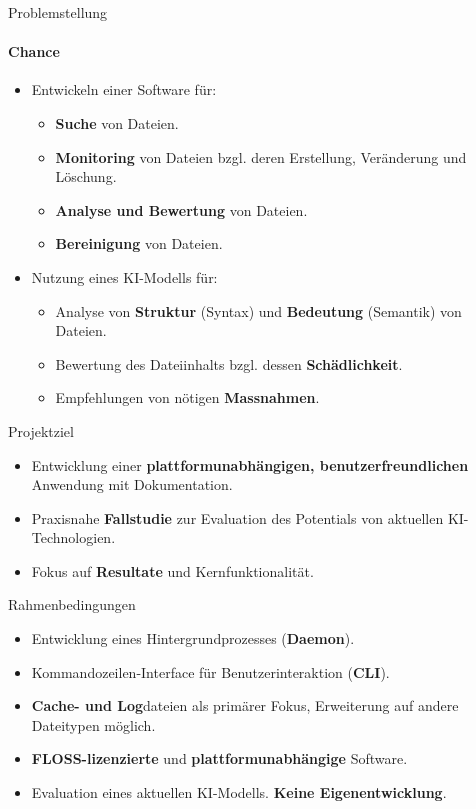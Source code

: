 \documentclass[
    ngerman,%
    authorontitle=true,
]{bfhbeamer}
\begin{document}
    \begin{frame}{Problemstellung}
        \framesubtitle{Chance}
        \begin{itemize}
            \item Entwickeln einer Software für:
            \begin{itemize}
                \item \textbf{Suche} von Dateien.
                \item \textbf{Monitoring} von Dateien bzgl. deren Erstellung, Veränderung und Löschung.
                \item \textbf{Analyse und Bewertung} von Dateien.
                \item \textbf{Bereinigung} von Dateien.
            \end{itemize}
            \item Nutzung eines KI-Modells für:
            \begin{itemize}
                \item Analyse von \textbf{Struktur} (Syntax) und \textbf{Bedeutung} (Semantik) von Dateien.
                \item Bewertung des Dateiinhalts bzgl.
                dessen \textbf{Schädlichkeit}.
                \item Empfehlungen von nötigen \textbf{Massnahmen}.
            \end{itemize}
        \end{itemize}
    \end{frame}

    \begin{frame}{Projektziel}
        \begin{itemize}
            \item Entwicklung einer \textbf{plattformunabh\"angigen, benutzerfreundlichen} Anwendung mit Dokumentation.
            \item Praxisnahe \textbf{Fallstudie} zur Evaluation des Potentials von aktuellen KI-Technologien.
            \item Fokus auf \textbf{Resultate} und Kernfunktionalit\"at.
        \end{itemize}
    \end{frame}

    \begin{frame}{Rahmenbedingungen}
        \begin{itemize}
            \item Entwicklung eines Hintergrundprozesses (\textbf{Daemon}).
            \item Kommandozeilen-Interface f\"ur Benutzerinteraktion (\textbf{CLI}).
            \item \textbf{Cache- und Log}dateien als prim\"arer Fokus, Erweiterung auf andere Dateitypen m\"oglich.
            \item \textbf{FLOSS-lizenzierte} und \textbf{plattformunabh\"angige} Software.
            \item Evaluation eines aktuellen KI-Modells. \textbf{Keine Eigenentwicklung}.
        \end{itemize}
    \end{frame}
\end{document}
